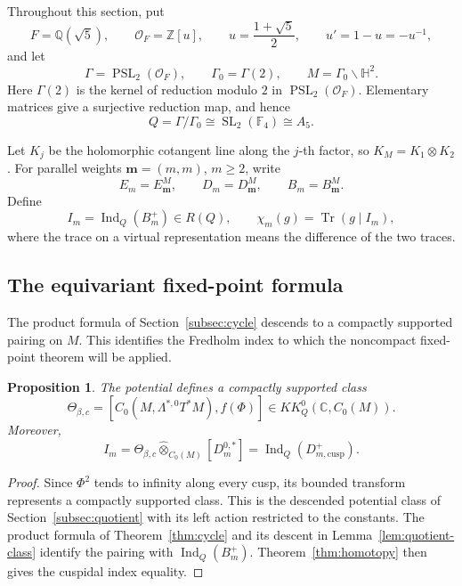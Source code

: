 \documentclass[11pt]{article}
\theoremstyle{definition}
\theoremstyle{plain}
\numberwithin{equation}{section}
\newtheorem{proposition}[theorem]{Proposition}
\newcommand{\HH}{\mathbb H}
\newcommand{\Ind}{\operatorname{Ind}}
\begin{document}
Throughout this section, put
\[
 F=\mathbb Q(\sqrt5),\qquad \mathcal O_F=\mathbb Z[u],\qquad
 u=\frac{1+\sqrt5}{2},\qquad u'=1-u=-u^{-1},
\]
and let
\[
 \Gamma=\operatorname{PSL}_2(\mathcal O_F),\qquad
 \Gamma_0=\Gamma(2),\qquad M=\Gamma_0\backslash\HH^2.
\]
Here $\Gamma(2)$ is the kernel of reduction modulo $2$ in
$\operatorname{PSL}_2(\mathcal O_F)$. Elementary matrices give a
surjective reduction map, and hence
\begin{equation}\label{eq:a5-quotient}
 Q=\Gamma/\Gamma_0\cong\operatorname{SL}_2(\mathbb F_4)\cong A_5.
\end{equation}

Let $K_j$ be the holomorphic cotangent line along the $j$-th
factor, so $K_M=K_1\otimes K_2$. For parallel weights \(\boldsymbol m=(m,m)\), \(m\geq2\), write
\[
E_m=E_{\boldsymbol m}^M,\qquad
D_m=D_{\boldsymbol m}^M,\qquad
B_m=B_{\boldsymbol m}^M.
\]
Define
\begin{equation}\label{eq:a5-index}
 I_m=\Ind_Q(B_m^+)\in R(Q),\qquad
 \chi_m(g)=\operatorname{Tr}(g\mid I_m),
\end{equation}
where the trace on a virtual representation means the difference
of the two traces.

\subsection{The equivariant fixed-point formula}
\label{subsec:a5-formula}

The product formula of Section~\ref{subsec:cycle} descends to a
compactly supported pairing on $M$. This identifies the Fredholm
index to which the noncompact fixed-point theorem will be applied.

\begin{proposition} \label{prop:a5-pairing}
The potential defines a compactly supported class
\[
\Theta_{\beta,c}
=[C_0(M,\Lambda^{*,0}T^*M),f(\Phi)]
\in KK_Q^0(\mathbb C,C_0(M)).
\]
Moreover,
\begin{equation}\label{eq:a5-pairing}
I_m=\Theta_{\beta,c}
\widehat\otimes_{C_0(M)}[D_m^{0,*}]
=\operatorname{Ind}_Q(D_{m,\mathrm{cusp}}^+).
\end{equation}
\end{proposition}
\begin{proof} Since \(\Phi^2\) tends to infinity along every cusp, its bounded transform represents a compactly supported class. This is the descended potential class of 	Section~\ref{subsec:quotient} with its left action restricted to the constants. The product formula of Theorem~\ref{thm:cycle} and its descent in Lemma~\ref{lem:quotient-class} identify the pairing with \(\operatorname{Ind}_Q(B_m^+)\). Theorem~\ref{thm:homotopy} then gives the cuspidal index equality.
\end{proof}
\end{document}
